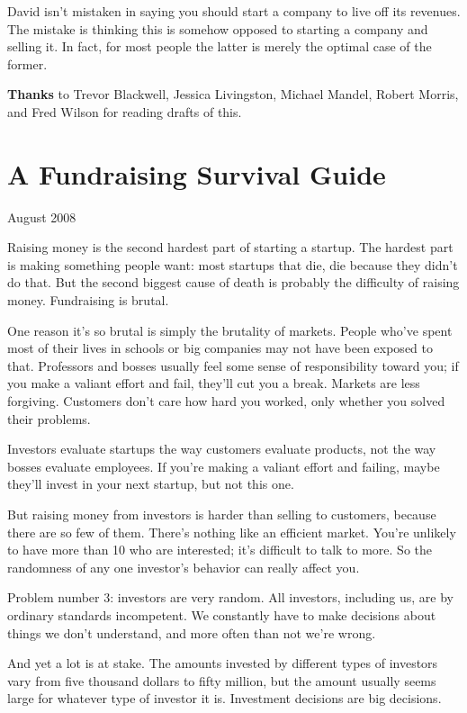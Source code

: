\documentclass[12pt]{book}
\begin{document}
David isn't mistaken in saying you should start a company to live off
its revenues. The mistake is thinking this is somehow opposed to
starting a company and selling it. In fact, for most people the latter
is merely the optimal case of the former.

\textbf{Thanks} to Trevor Blackwell, Jessica Livingston, Michael Mandel,
Robert Morris, and Fred Wilson for reading drafts of this.
\chapter{A Fundraising Survival Guide}

August 2008

Raising money is the second hardest part of starting a startup. The
hardest part is making something people want: most startups that die,
die because they didn't do that. But the second biggest cause of death
is probably the difficulty of raising money. Fundraising is brutal.

One reason it's so brutal is simply the brutality of markets. People
who've spent most of their lives in schools or big companies may not
have been exposed to that. Professors and bosses usually feel some sense
of responsibility toward you; if you make a valiant effort and fail,
they'll cut you a break. Markets are less forgiving. Customers don't
care how hard you worked, only whether you solved their problems.

Investors evaluate startups the way customers evaluate products, not the
way bosses evaluate employees. If you're making a valiant effort and
failing, maybe they'll invest in your next startup, but not this one.

But raising money from investors is harder than selling to customers,
because there are so few of them. There's nothing like an efficient
market. You're unlikely to have more than 10 who are interested; it's
difficult to talk to more. So the randomness of any one investor's
behavior can really affect you.

Problem number 3: investors are very random. All investors, including
us, are by ordinary standards incompetent. We constantly have to make
decisions about things we don't understand, and more often than not
we're wrong.

And yet a lot is at stake. The amounts invested by different types of
investors vary from five thousand dollars to fifty million, but the
amount usually seems large for whatever type of investor it is.
Investment decisions are big decisions.
\end{document}
